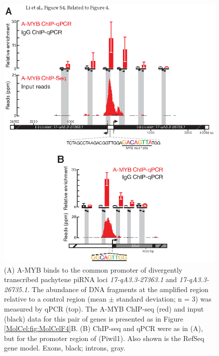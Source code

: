     \begin{figure} %
      \centering 
      \includegraphics{Figures/MolCel/MolCel2013_FigS4.eps}
      \caption[ChIP-qPCR Confirms ChIP-seq Data]
      {
     	 (A) A-MYB binds to the common promoter of divergently transcribed pachytene piRNA loci \textit{17-qA3.3-27363.1} and \textit{17-qA3.3-26735.1}. The abundance of DNA fragments at the amplified region relative to a control region (mean $\pm$ standard deviation; n = 3) was measured by qPCR (top). The A-MYB ChIP-seq (red) and input (black) data for this pair of genes is presented as in Figure \ref{MolCel:fig:MolCelF4}B. (B) ChIP-seq and qPCR were as in (A), but for the promoter region of \miwi{} (Piwil1). Also shown is the RefSeq gene model. Exons, black; introns, gray.
     	 }
      \label{MolCel:fig:MolCelS4}
    	\end{figure}

